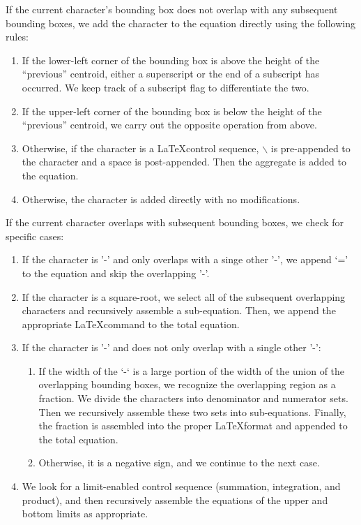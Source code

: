 \documentclass[journal]{IEEEtran}
\begin{document}
If the current character's bounding box does not overlap with any subsequent bounding boxes, we add the character to the equation directly using the following rules:
\begin{enumerate}
    \item If the lower-left corner of the bounding box is above the height of the “previous” centroid, either a superscript or the end of a subscript has occurred. We keep track of a subscript flag to differentiate the two.
    \item If the upper-left corner of the bounding box is below the height of the “previous” centroid, we carry out the opposite operation from above.
    \item Otherwise, if the character is a \LaTeX control sequence, $\backslash$ is pre-appended to the character and a space is post-appended. Then the aggregate is added to the equation.
    \item Otherwise, the character is added directly with no modifications.
    
\end{enumerate}

If the current character overlaps with subsequent bounding boxes, we check for specific cases:
\begin{enumerate}    
    \item If the character is '-' and only overlaps with a singe other '-', we append ‘=’ to the equation and skip the overlapping '-'.
    \item If the character is a square-root, we select all of the subsequent overlapping characters and recursively assemble a sub-equation. Then, we append the appropriate \LaTeX command to the total equation.
    \item If the character is '-' and does not only overlap with a single other '-':
    \begin{enumerate}
	    \item If the width of the ‘-‘ is a large portion of the width of the union of the overlapping bounding boxes, we recognize the overlapping region as a fraction. We divide the characters into  denominator and numerator sets. Then we recursively assemble these two sets into sub-equations. Finally, the fraction is assembled into the proper \LaTeX format and appended to the total equation.
	    \item Otherwise, it is a negative sign, and we continue to the next case.
	\end{enumerate}
    \item We look for a limit-enabled control sequence (summation, integration, and product), and then recursively assemble the equations of the upper and bottom limits as appropriate.
\end{enumerate}
\end{document}

